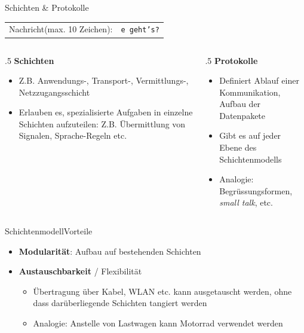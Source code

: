 \begin{frame}[fragile]{Schichten \& Protokolle}
{\begin{table}[H]
\begin{tabular}{p{2cm}|l}
                \rowcolor{\applicationLayerColor!20}Nachricht\newline\tiny (max. 10 Zeichen): & \texttt{e geht's?}    \\
            \end{tabular}
        \end{table}
    }
    \pause
    \begin{columns}[t]
        \begin{column}{.5\textwidth}
            \textbf{Schichten}
            \begin{itemize}[<+->]
                \item Z.B. Anwendungs-, Transport-, Vermittlungs-, Netzzugangsschicht
                \item Erlauben es, spezialisierte Aufgaben in einzelne Schichten aufzuteilen: Z.B. Übermittlung von Signalen, Sprache-Regeln etc.
            \end{itemize}
        \end{column}
        \pause
        \begin{column}{.5\textwidth}
            \textbf{Protokolle}
            \begin{itemize}[<+->]
                \item Definiert Ablauf einer Kommunikation, Aufbau der Datenpakete
                \item Gibt es auf jeder Ebene des Schichtenmodells
                \item Analogie: Begrüssungsformen, \textit{small talk}, etc.
            \end{itemize}
        \end{column}
    \end{columns}
\end{frame}

\begin{frame}[fragile]{Schichtenmodell}{Vorteile}
    \begin{itemize}[<+->]
        \item \textbf{Modularität}: Aufbau auf bestehenden Schichten
        \item \textbf{Austauschbarkeit} / Flexibilität
              \begin{itemize}
                  \item Übertragung über Kabel, WLAN etc. kann ausgetauscht werden, ohne dass darüberliegende Schichten tangiert werden
                  \item Analogie: Anstelle von Lastwagen kann Motorrad verwendet werden
              \end{itemize}
    \end{itemize}
\end{frame}


